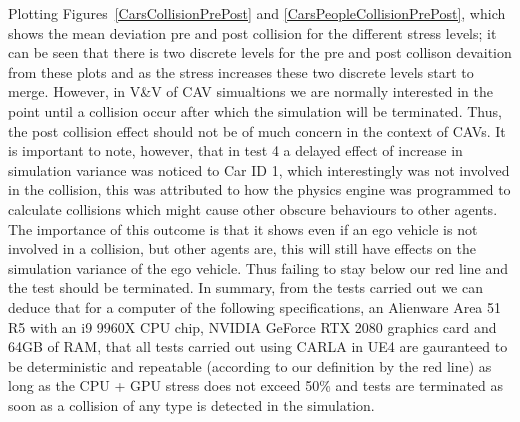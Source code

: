 Plotting Figures~\ref{CarsCollisionPrePost} and \ref{CarsPeopleCollisionPrePost}, which shows the mean deviation pre and post collision for the different stress levels; it can be seen that there is two discrete levels for the pre and post collison devaition from these plots and as the stress increases these two discrete levels start to merge. 
However, in V\&V of CAV simualtions we  are normally interested in the point until a collision occur after which the simulation will be terminated. Thus, the post collision effect should not be of much concern in the context of CAVs.
It is important to note, however, that in test 4 a delayed effect of increase in simulation variance was noticed to Car ID 1, which interestingly was not involved in the collision, this was attributed to how the physics engine was programmed to calculate collisions which might cause other obscure behaviours to other agents. The importance of this outcome is that it shows even if an ego vehicle is not involved in a collision, but other agents are, this will still have effects on the simulation variance of the ego vehicle. Thus failing to stay below our red line and the test should be terminated.
In summary, from the tests carried out we can deduce that for a computer of the following specifications, an Alienware Area 51 R5 with an i9 9960X CPU chip, NVIDIA GeForce RTX 2080 graphics card and 64GB of RAM, that all tests carried out using CARLA in UE4 are gauranteed to be deterministic and repeatable (according to our definition by the red line) as long as the CPU + GPU stress does not exceed 50\% and tests are terminated as soon as a collision of any type is detected in the simulation. 
